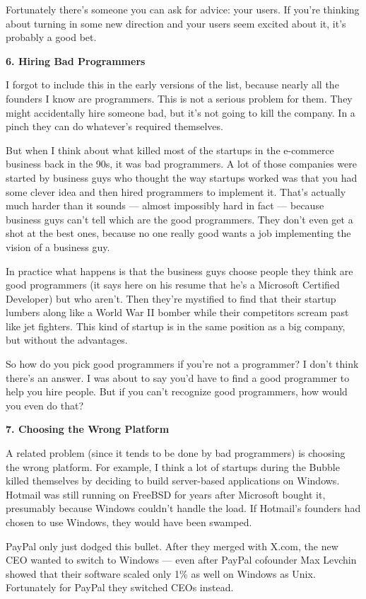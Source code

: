 Fortunately there's someone you can ask for advice: your users. If
you're thinking about turning in some new direction and your users seem
excited about it, it's probably a good bet.

\textbf{6. Hiring Bad Programmers}

I forgot to include this in the early versions of the list, because
nearly all the founders I know are programmers. This is not a serious
problem for them. They might accidentally hire someone bad, but it's not
going to kill the company. In a pinch they can do whatever's required
themselves.

But when I think about what killed most of the startups in the
e-commerce business back in the 90s, it was bad programmers. A lot of
those companies were started by business guys who thought the way
startups worked was that you had some clever idea and then hired
programmers to implement it. That's actually much harder than it sounds
--- almost impossibly hard in fact --- because business guys can't tell
which are the good programmers. They don't even get a shot at the best
ones, because no one really good wants a job implementing the vision of
a business guy.

In practice what happens is that the business guys choose people they
think are good programmers (it says here on his resume that he's a
Microsoft Certified Developer) but who aren't. Then they're mystified to
find that their startup lumbers along like a World War II bomber while
their competitors scream past like jet fighters. This kind of startup is
in the same position as a big company, but without the advantages.

So how do you pick good programmers if you're not a programmer? I don't
think there's an answer. I was about to say you'd have to find a good
programmer to help you hire people. But if you can't recognize good
programmers, how would you even do that?

\textbf{7. Choosing the Wrong Platform}

A related problem (since it tends to be done by bad programmers) is
choosing the wrong platform. For example, I think a lot of startups
during the Bubble killed themselves by deciding to build server-based
applications on Windows. Hotmail was still running on FreeBSD for years
after Microsoft bought it, presumably because Windows couldn't handle
the load. If Hotmail's founders had chosen to use Windows, they would
have been swamped.

PayPal only just dodged this bullet. After they merged with X.com, the
new CEO wanted to switch to Windows --- even after PayPal cofounder Max
Levchin showed that their software scaled only 1\% as well on Windows as
Unix. Fortunately for PayPal they switched CEOs instead.

